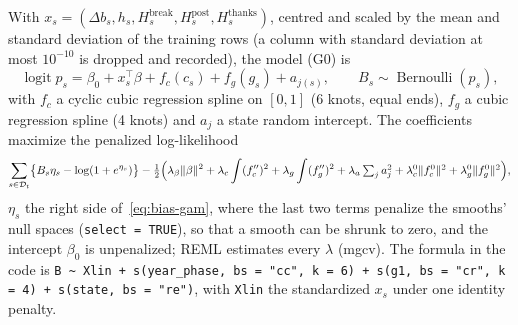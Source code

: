\documentclass[11pt,a4paper]{article}
\DeclarePairedDelimiter{\norm}{\lVert}{\rVert}
\theoremstyle{definition}
\theoremstyle{remark}
\begin{document}
With $x_s=(\Delta b_s,h_s,H^{\mathrm{break}}_s,H^{\mathrm{post}}_s,
H^{\mathrm{thanks}}_s)$, centred and scaled by the mean and standard
deviation of the training rows (a column with standard deviation at most
$10^{-10}$ is dropped and recorded), the model (G0) is
\begin{equation}
 \operatorname{logit}p_s=\beta_0+x_s^\top\beta+f_c(c_s)+f_g(g_s)+a_{j(s)},
 \qquad B_s\sim\operatorname{Bernoulli}(p_s),
 \label{eq:bias-gam}
\end{equation}
with $f_c$ a cyclic cubic regression spline on $[0,1]$ (6 knots, equal
ends), $f_g$ a cubic regression spline (4 knots) and $a_j$ a state random
intercept. The coefficients maximize the penalized log-likelihood
\[
 \sum_{s\in\mathcal D_t}\bigl\{B_s\eta_s-\log(1+e^{\eta_s})\bigr\}
 -\tfrac12\Bigl(\lambda_\beta\norm{\beta}^2+\lambda_c\int(f_c'')^2
 +\lambda_g\int(f_g'')^2+\lambda_a\textstyle\sum_ja_j^2
 +\lambda_c^0\norm{f_c^0}^2+\lambda_g^0\norm{f_g^0}^2\Bigr),
\]
$\eta_s$ the right side of~\eqref{eq:bias-gam}, where the last two terms
penalize the smooths' null spaces (\texttt{select = TRUE}), so that a
smooth can be shrunk to zero, and the intercept $\beta_0$ is unpenalized;
REML estimates every $\lambda$ (mgcv). The formula in the code is
\texttt{B \textasciitilde{} Xlin + s(year\_phase, bs = "cc", k = 6) +
s(g1, bs = "cr", k = 4) + s(state, bs = "re")}, with \texttt{Xlin} the
standardized $x_s$ under one identity penalty.
\end{document}
